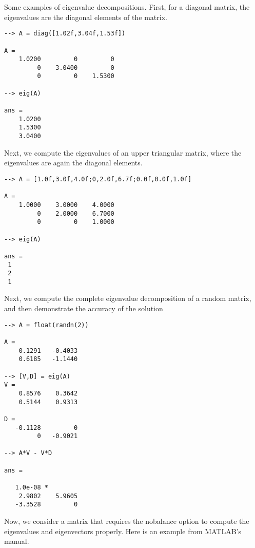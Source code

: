 Some examples of eigenvalue decompositions.  First, for a diagonal
matrix, the eigenvalues are the diagonal elements of the matrix.
\begin{verbatim}
--> A = diag([1.02f,3.04f,1.53f])

A = 
    1.0200         0         0 
         0    3.0400         0 
         0         0    1.5300 

--> eig(A)

ans = 
    1.0200 
    1.5300 
    3.0400 
\end{verbatim}
Next, we compute the eigenvalues of an upper triangular matrix, 
where the eigenvalues are again the diagonal elements.
\begin{verbatim}
--> A = [1.0f,3.0f,4.0f;0,2.0f,6.7f;0.0f,0.0f,1.0f]

A = 
    1.0000    3.0000    4.0000 
         0    2.0000    6.7000 
         0         0    1.0000 

--> eig(A)

ans = 
 1 
 2 
 1 
\end{verbatim}
Next, we compute the complete eigenvalue decomposition of
a random matrix, and then demonstrate the accuracy of the solution
\begin{verbatim}
--> A = float(randn(2))

A = 
    0.1291   -0.4033 
    0.6185   -1.1440 

--> [V,D] = eig(A)
V = 
    0.8576    0.3642 
    0.5144    0.9313 

D = 
   -0.1128         0 
         0   -0.9021 

--> A*V - V*D

ans = 

   1.0e-08 * 
    2.9802    5.9605 
   -3.3528         0 
\end{verbatim}
Now, we consider a matrix that requires the nobalance option
to compute the eigenvalues and eigenvectors properly.  Here is
an example from MATLAB's manual.
